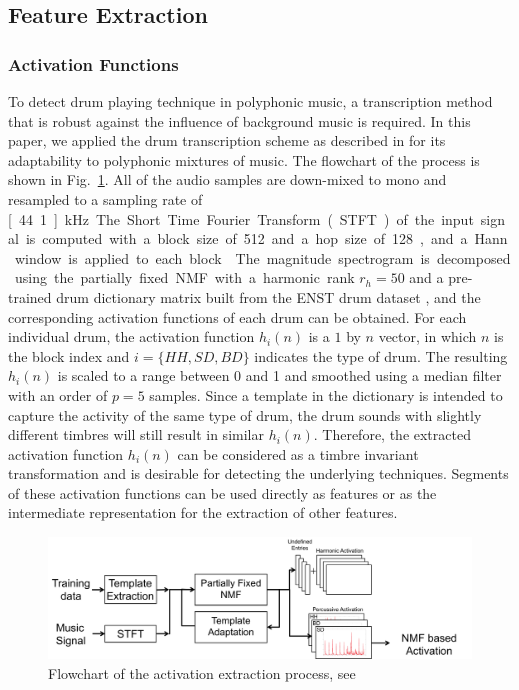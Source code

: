 \documentclass{article}
\begin{document}
\subsection{Feature Extraction}\label{ssec:featuresExtract}
\subsubsection{Activation Functions}
\label{sssec:activ}

To detect drum playing technique in polyphonic music, a transcription method that is robust against the influence of background music is required. In this paper, we applied the drum transcription scheme as described in \cite{Wu2015a} for its adaptability to polyphonic mixtures of music. The flowchart of the process is shown in Fig.~\ref{fig:nmf}. All of the audio samples are down-mixed to mono and resampled to a sampling rate of \unit[44.1]{kHz}. The Short Time Fourier Transform (STFT) of the input signal is computed with a block size of 512 and a hop size of 128, and a Hann window is applied to each block. 

{\color{red}{Since the reader does not know the algorithm in the first place, it doesn't make sense to give the detailed parametrization. You need a short overview of how the method works and then you can give the parametrization. But I don't think it has to be this lengthy...}} The magnitude spectrogram is decomposed using the partially fixed NMF with a harmonic rank $r_{h} = 50$ and a pre-trained drum dictionary matrix built from the ENST drum dataset \cite{Gillet2006}, and the corresponding activation functions of each drum can be obtained. For each individual drum, the activation function $h_{i}(n)$ is a $1$ by $n$ vector, in which $n$ is the block index and $i = \{HH, SD, BD\}$ indicates the type of drum. The resulting $h_{i}(n)$ is scaled to a range between 0 and 1 and smoothed using a median filter with an order of $p = 5$ samples. Since a template in the dictionary is intended to capture the activity of the same type of drum, the drum sounds with slightly different timbres will still result in similar $h_{i}(n)$. Therefore, the extracted activation function $h_{i}(n)$ can be considered as a timbre invariant transformation and is desirable for detecting the underlying techniques. Segments of these activation functions can be used directly as features or as the intermediate representation for the extraction of other features. 

\begin{figure}
\centering
\includegraphics[width = 8.5 cm]{./figures/nmf.png}
\caption{Flowchart of the activation extraction process, see \cite{Wu2015a}}
\label{fig:nmf}
\end{figure}
\end{document}

